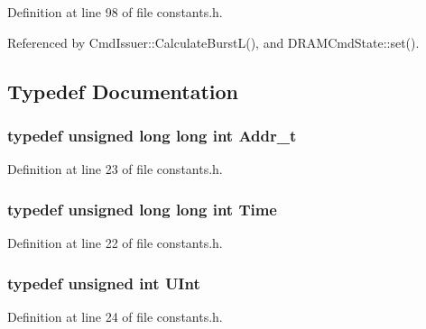 Definition at line 98 of file constants.h.

Referenced by CmdIssuer::CalculateBurstL(), and DRAMCmdState::set().

\subsection{Typedef Documentation}
\subsubsection[{Addr\_\-t}]{\setlength{\rightskip}{0pt plus 5cm}typedef unsigned long long int {\bf Addr\_\-t}}\label{constants_8h_51badf0ffa6471a1e529c69852e56f57}




Definition at line 23 of file constants.h.
\subsubsection[{Time}]{\setlength{\rightskip}{0pt plus 5cm}typedef unsigned long long int {\bf Time}}\label{constants_8h_a475e5c84e5eb0fe317942dc62553f7e}




Definition at line 22 of file constants.h.
\subsubsection[{UInt}]{\setlength{\rightskip}{0pt plus 5cm}typedef unsigned int {\bf UInt}}\label{constants_8h_ba0996d26f7be2572973245b51852757}




Definition at line 24 of file constants.h.